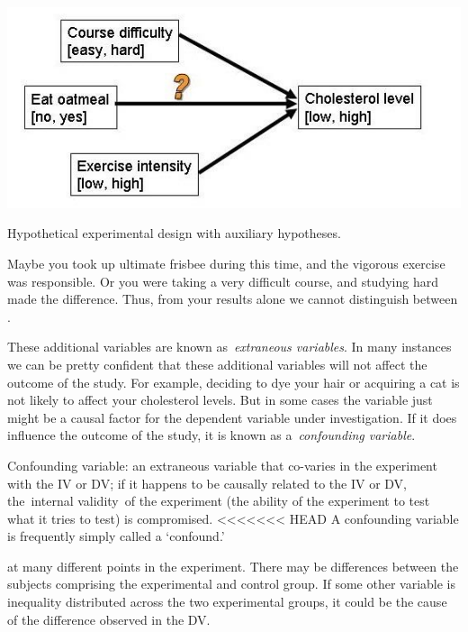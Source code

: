 \begin{refsection}
\begin{marginfigure}
\begin{center}
  \includegraphics{../images/cholesterolcausaldiagram.jpg}
\end{center}
 \caption{Hypothetical experimental design with auxiliary hypotheses.}
\label{fig: cholestrol-withauxiliary}
\end{marginfigure}
Maybe you took up ultimate frisbee during this time, and the vigorous exercise was responsible. Or you were taking a very difficult course, and studying hard made the difference. Thus, from your results alone we cannot distinguish between .

These additional variables are known as \emph{extraneous variables}. In many instances we can be pretty confident that these additional variables will not affect the outcome of the study. For example, deciding to dye your hair or acquiring a cat is not likely to affect your cholesterol levels. But in some cases the variable just might be a causal factor for the dependent variable under investigation. If it does influence the outcome of the study, it is known as a \emph{confounding variable}.

\begin{thesis}\label{thesis:confoundingvariables}Confounding variable: an extraneous variable that co-varies in the experiment with the IV or DV; if it happens to be causally related to the IV or DV, the internal validity of the experiment (the ability of the experiment to test what it tries to test) is compromised. \newline
<<<<<<< HEAD
A confounding variable is frequently simply called a ‘confound.’\end{thesis}

 at many different points in the experiment. There may be differences between the subjects comprising the experimental and control group. If some other variable is inequality distributed across the two experimental groups, it could be the cause of the difference observed in the DV. 


\end{refsection}
